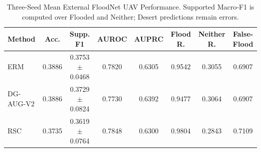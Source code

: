 
\begin{table}[t]
\centering
\caption{Three-Seed Mean External FloodNet UAV Performance.
Supported Macro-F1 is computed over Flooded and Neither;
Desert predictions remain errors.}
\label{tab:floodnet_external}
\footnotesize
\setlength{\tabcolsep}{3.5pt}
\begin{tabular}{lccccccc}
\hline
Method & Acc. & Supp. F1 & AUROC & AUPRC &
Flood R. & Neither R. & False-Flood \\
\hline
ERM & 0.3886 & 0.3753$\pm$0.0468 & 0.7820 & 0.6305 & 0.9542 & 0.3055 & 0.6907 \\
DG-AUG-V2 & 0.3886 & 0.3729$\pm$0.0824 & 0.7730 & 0.6392 & 0.9477 & 0.3064 & 0.6907 \\
RSC & 0.3735 & 0.3619$\pm$0.0764 & 0.7848 & 0.6300 & 0.9804 & 0.2843 & 0.7109 \\
\hline
\end{tabular}
\end{table}
